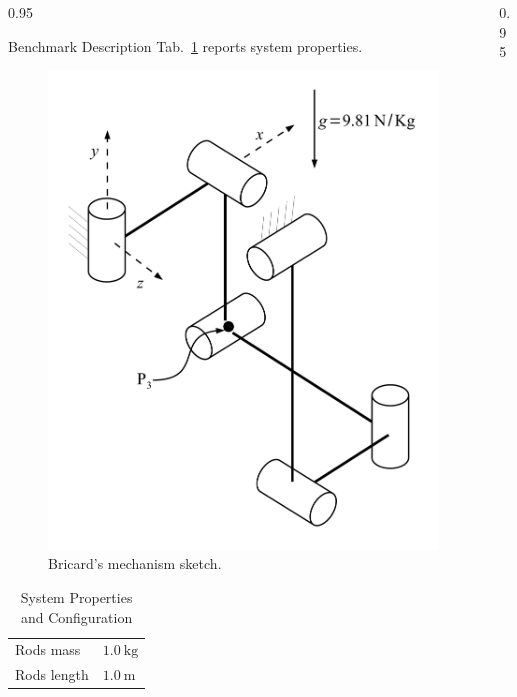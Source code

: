 \documentclass[final]{beamer}
\newlength{\onecolwid}
\newlength{\twocolwid}
\begin{document}
\begin{frame}[t]
\begin{columns}[t]
\begin{column}{\twocolwid}
\begin{columns}[t, totalwidth=\twocolwid]
\begin{column}{0.95\onecolwid}
\begin{block}{Benchmark Description}
 Tab.~\ref{TAB:SystemProperties} reports system properties.


\end{block}


\begin{figure}
\includegraphics[width=0.8\linewidth]{4MBS_Bricard.pdf}
\caption{Bricard's mechanism sketch.}
\label{FIG:Bricard}
\end{figure}

\centering
\begin{table}
\begin{large}
	\begin{tabular}[b]{ll}
	\toprule
	Rods mass & $\SI{1.0}{\kilogram}$\\
	Rods length & $\SI{1.0}{\meter}$\\	
	\bottomrule
	\end{tabular}
	\end{large}
	\caption{System Properties and Configuration}
    \label{TAB:SystemProperties}
\end{table}
\end{column}

\begin{column}{0.95\onecolwid}







\end{column}
\end{columns}
\end{column}
\end{columns}
\end{frame}
\end{document}
